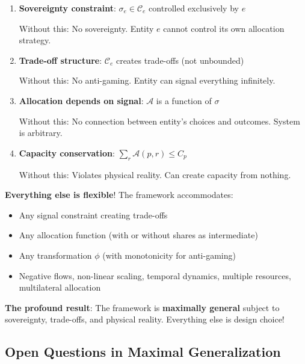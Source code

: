 \documentclass[11pt,a4paper]{article}
\theoremstyle{definition}
\theoremstyle{remark}
\begin{document}
\begin{enumerate}
\item \textbf{Sovereignty constraint}: $\sigma_e \in \mathcal{C}_e$ controlled exclusively by $e$
   
   Without this: No sovereignty. Entity $e$ cannot control its own allocation strategy.

\item \textbf{Trade-off structure}: $\mathcal{C}_e$ creates trade-offs (not unbounded)
   
   Without this: No anti-gaming. Entity can signal everything infinitely.

\item \textbf{Allocation depends on signal}: $\mathcal{A}$ is a function of $\sigma$
   
   Without this: No connection between entity's choices and outcomes. System is arbitrary.

\item \textbf{Capacity conservation}: $\sum_r \mathcal{A}(p,r) \le C_p$
   
   Without this: Violates physical reality. Can create capacity from nothing.
\end{enumerate}

\textbf{Everything else is flexible}! The framework accommodates:
\begin{itemize}
\item Any signal constraint creating trade-offs
\item Any allocation function (with or without shares as intermediate)
\item Any transformation $\phi$ (with monotonicity for anti-gaming)
\item Negative flows, non-linear scaling, temporal dynamics, multiple resources, multilateral allocation
\end{itemize}

\textbf{The profound result}: The framework is \textbf{maximally general} subject to sovereignty, trade-offs, and physical reality. Everything else is design choice!

\subsection{Open Questions in Maximal Generalization}
\end{document}
